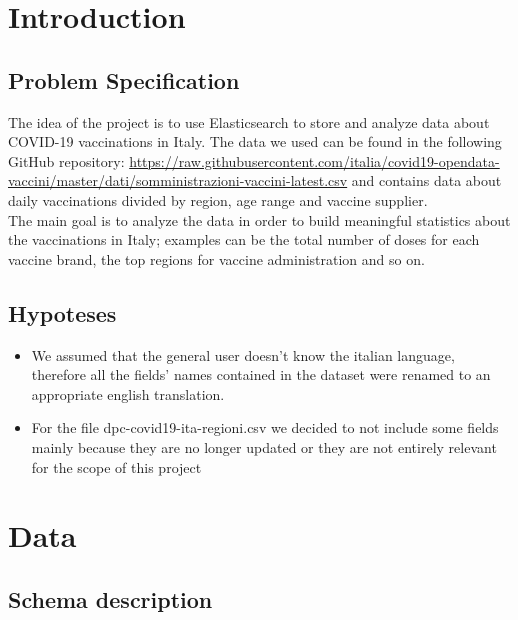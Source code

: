 \documentclass[12pt, a4paper]{article}
\begin{document}
\listoftodos

\clearpage

\setlength{\parskip}{\baselineskip}%
\setlength{\parindent}{0pt}%

\section{Introduction}

\subsection{Problem Specification}

The idea of the project is to use Elasticsearch to store and analyze data about 
COVID-19 vaccinations in Italy. The data we used can be found in the following 
GitHub repository: \url{https://raw.githubusercontent.com/italia/covid19-opendata-vaccini/master/dati/somministrazioni-vaccini-latest.csv}
and contains data about daily vaccinations divided by region, age range and vaccine
supplier. \\ 
The main goal is to analyze the data in order to build meaningful statistics 
about the vaccinations in Italy; examples can be the total number of doses for each 
vaccine brand, the top regions for vaccine administration and so on.

\subsection{Hypoteses}

\begin{itemize}
  \item[] We assumed that the general user doesn't know the italian language, therefore
    all the fields' names contained in the dataset were renamed to an appropriate 
    english translation. 
  \item[] For the file dpc-covid19-ita-regioni.csv we decided to not include some fields
    mainly because they are no longer updated or they are not entirely relevant for the
    scope of this project 
\end{itemize}
  
\clearpage

\section{Data }

\subsection{Schema description}
\end{document}
